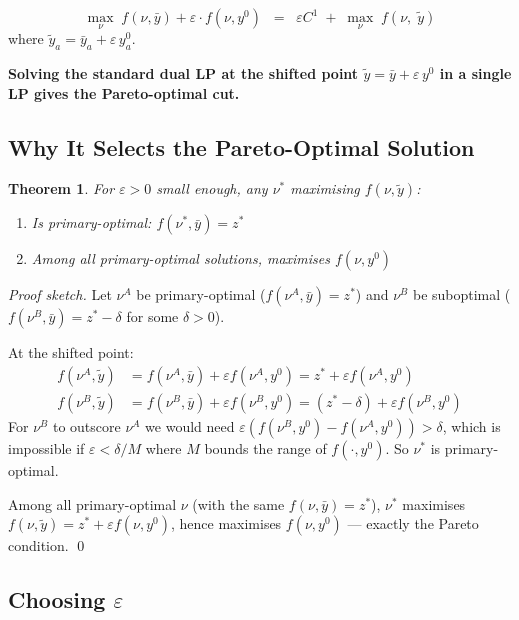 \documentclass[12pt,a4paper]{article}
\newtheorem{theorem}{Theorem}
\begin{document}
\begin{tcolorbox}[colback=lightgreen,title=\textbf{Key Result}]
\[
\max_\nu\; f(\nu,\bar{y}) + \varepsilon\cdot f(\nu,y^0)
\;\;=\;\;
\varepsilon C^1 \;+\; \max_\nu\; f\!\left(\nu,\; \tilde{y}\right)
\]
where $\tilde{y}_a = \bar{y}_a + \varepsilon\, y^0_a$.

\medskip
\textbf{Solving the standard dual LP at the shifted point
$\tilde{y} = \bar{y} + \varepsilon\, y^0$ in a single LP gives the
Pareto-optimal cut.}
\end{tcolorbox}

\subsection{Why It Selects the Pareto-Optimal Solution}

\begin{theorem}
For $\varepsilon > 0$ small enough, any $\nu^*$ maximising $f(\nu, \tilde{y})$:
\begin{enumerate}
  \item Is primary-optimal: $f(\nu^*, \bar{y}) = z^*$
  \item Among all primary-optimal solutions, maximises $f(\nu, y^0)$
\end{enumerate}
\end{theorem}

\begin{proof}[Proof sketch]
Let $\nu^A$ be primary-optimal ($f(\nu^A, \bar{y})=z^*$) and $\nu^B$ be
suboptimal ($f(\nu^B, \bar{y}) = z^* - \delta$ for some $\delta > 0$).

At the shifted point:
\begin{align*}
f(\nu^A, \tilde{y}) &= f(\nu^A,\bar{y}) + \varepsilon f(\nu^A,y^0)
   = z^* + \varepsilon f(\nu^A,y^0)\\
f(\nu^B, \tilde{y}) &= f(\nu^B,\bar{y}) + \varepsilon f(\nu^B,y^0)
   = (z^*-\delta) + \varepsilon f(\nu^B,y^0)
\end{align*}
For $\nu^B$ to outscore $\nu^A$ we would need
$\varepsilon(f(\nu^B,y^0)-f(\nu^A,y^0)) > \delta$,
which is impossible if $\varepsilon < \delta / M$ where $M$ bounds the
range of $f(\cdot, y^0)$.  So $\nu^*$ is primary-optimal.

Among all primary-optimal $\nu$ (with the same $f(\nu,\bar{y})=z^*$),
$\nu^*$ maximises $f(\nu,\tilde{y}) = z^* + \varepsilon f(\nu,y^0)$,
hence maximises $f(\nu,y^0)$ — exactly the Pareto condition. \qed
\end{proof}

\subsection{Choosing $\varepsilon$}
\end{document}

